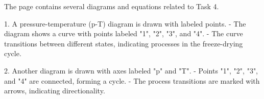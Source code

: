 The page contains several diagrams and equations related to Task 4.  

1. A pressure-temperature (p-T) diagram is drawn with labeled points.  
   - The diagram shows a curve with points labeled "1", "2", "3", and "4".  
   - The curve transitions between different states, indicating processes in the freeze-drying cycle.  

2. Another diagram is drawn with axes labeled "p" and "T".  
   - Points "1", "2", "3", and "4" are connected, forming a cycle.  
   - The process transitions are marked with arrows, indicating directionality.